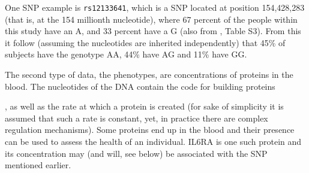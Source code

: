 One SNP example is \verb|rs12133641|, which is a SNP located at position 
154,428,283 (that is, at the 154 millionth nucleotide), 
where 67 percent of the people within this study have an A,
and 33 percent have a G (also from \cite{ahsan2017relative}, Table S3).
From this it follow (assuming the nucleotides are inherited independently)
that 45\% of subjects have the genotype AA, 44\% have AG and 11\% have GG.

The second type of data, the phenotypes, 
are concentrations of proteins in the blood. 
The nucleotides of the DNA contain the code for building proteins

,
as well as the rate at which a protein is created (for 
sake of simplicity it is assumed that such a rate is constant,
yet, in practice there are complex regulation mechanisms).
Some proteins end up in the blood and
their presence can be used to assess the health of an individual.
IL6RA is one such protein and its concentration may (and will, see below)
be associated with the SNP mentioned earlier.

